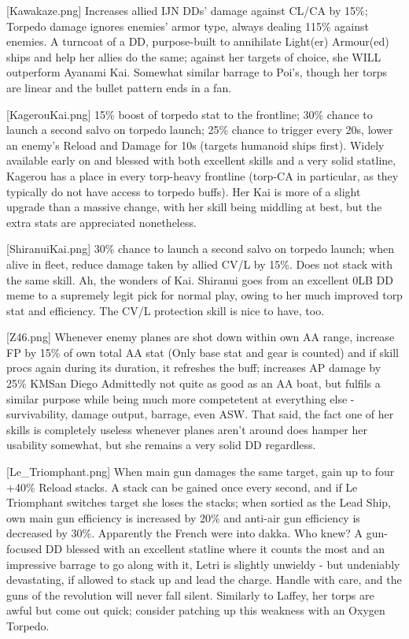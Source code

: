 [Kawakaze.png]
{Increases allied IJN DDs' damage against CL/CA by 15\%; Torpedo damage ignores enemies' armor type, always dealing 115\% against enemies.}
{}
{A turncoat of a DD, purpose-built to annihilate Light(er) Armour(ed) ships and help her allies do the same; against her targets of choice, she WILL outperform Ayanami Kai. Somewhat similar barrage to Poi's, though her torps are linear and the bullet pattern ends in a fan.}

[KagerouKai.png]
{15\% boost of torpedo stat to the frontline; 30\% chance to launch a second salvo on torpedo launch; 25\% chance to trigger every 20s, lower an enemy's Reload and Damage for 10s (targets humanoid ships first).}
{}
{Widely available early on and blessed with both excellent skills and a very solid statline, Kagerou has a place in every torp-heavy frontline (torp-CA in particular, as they typically do not have access to torpedo buffs). Her Kai is more of a slight upgrade than a massive change, with her skill being middling at best, but the extra stats are appreciated nonetheless.}

[ShiranuiKai.png]
{30\% chance to launch a second salvo on torpedo launch; when alive in fleet, reduce damage taken by allied CV/L by 15\%. Does not stack with the same skill. }
{}
{Ah, the wonders of Kai. Shiranui goes from an excellent 0LB DD meme to a supremely legit pick for normal play, owing to her much improved torp stat and efficiency. The CV/L protection skill is nice to have, too.}

[Z46.png]
{Whenever enemy planes are shot down within own AA range, increase FP by 15\% of own total AA stat (Only base stat and gear is counted) and if skill procs again during its duration, it refreshes the buff; increases AP damage by 25\%}
{KMSan Diego}
{Admittedly not quite as good as an AA boat, but fulfils a similar purpose while being much more competetent at everything else - survivability, damage output, barrage, even ASW.
That said, the fact one of her skills is completely useless whenever planes aren't around does hamper her usability somewhat, but she remains a very solid DD regardless.}
 
[Le_Triomphant.png]
{When main gun damages the same target, gain up to four +40\% Reload stacks. A stack can be gained once every second, and if Le Triomphant switches target she loses the stacks; when sortied as the Lead Ship, own main gun efficiency is increased by 20\% and anti-air gun efficiency is decreased by 30\%. }
{}
{Apparently the French were into dakka. Who knew?
A gun-focused DD blessed with an excellent statline where it counts the most and an impressive barrage to go along with it, Letri is slightly unwieldy - but undeniably devastating, if allowed to stack up and lead the charge. Handle with care, and the guns of the revolution will never fall silent.
Similarly to Laffey, her torps are awful but come out quick; consider patching up this weakness with an Oxygen Torpedo.}

